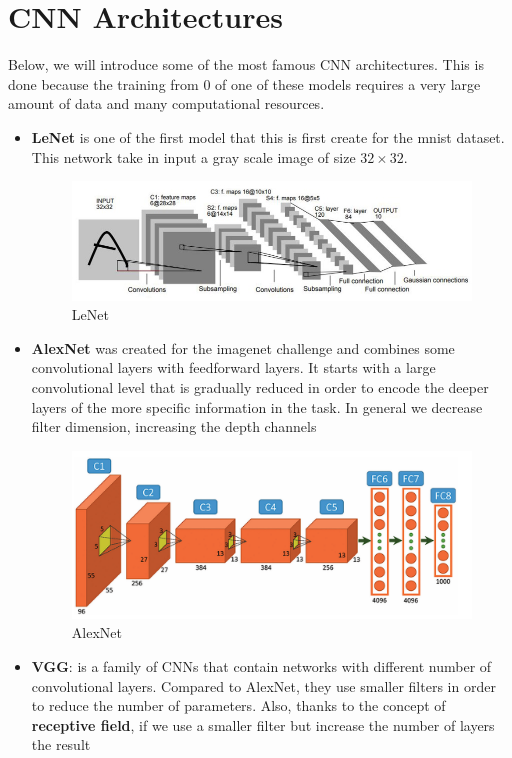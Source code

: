 \section{CNN Architectures}
Below, we will introduce some of the most famous CNN architectures. This is done because 
the training from 0 of one of these models requires a very large amount of data and many
computational resources.
\begin{itemize}
    \item \textbf{LeNet} is one of the first model that this is first create for the mnist 
        dataset. This network take in input a gray scale image of size $32 \times 32$.
        \begin{figure}[!ht]
            \centering
            \includegraphics[width=0.5\linewidth]{img/CNN/LeNet-5.jpeg}
            \caption{LeNet}
            \label{fig:lenet}
        \end{figure}
    \item \textbf{AlexNet} was created for the imagenet challenge and combines some 
        convolutional layers with feedforward layers. It starts with a large convolutional 
        level that is gradually reduced in order to encode the deeper layers of the more 
        specific information in the task. In general we decrease filter dimension,
        increasing the depth channels
        \begin{figure}[!ht]
            \centering
            \includegraphics[width=0.5\linewidth]{img/CNN/alexNet.png}
            \caption{AlexNet}
            \label{fig:enter-label}
        \end{figure}
    \item \textbf{VGG}: is a family of CNNs that contain networks with different number of
        convolutional layers. Compared to AlexNet, they use smaller filters in order to 
        reduce the number of parameters. Also, thanks to the concept of \textbf{receptive 
            field}, if we use a smaller filter but increase the number of layers the result 

\end{itemize}
